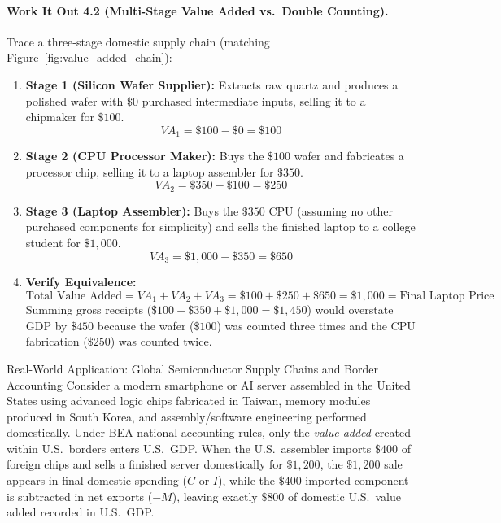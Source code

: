 \documentclass[11pt,letterpaper]{article}
\begin{document}
\paragraph{Work It Out 4.2 (Multi-Stage Value Added vs.\ Double Counting).}
Trace a three-stage domestic supply chain (matching Figure~\ref{fig:value_added_chain}):
\begin{enumerate}
    \item \textbf{Stage 1 (Silicon Wafer Supplier):} Extracts raw quartz and produces a polished wafer with $\$0$ purchased intermediate inputs, selling it to a chipmaker for $\$100$.
    $$VA_1 = \$100 - \$0 = \$100$$
    \item \textbf{Stage 2 (CPU Processor Maker):} Buys the $\$100$ wafer and fabricates a processor chip, selling it to a laptop assembler for $\$350$.
    $$VA_2 = \$350 - \$100 = \$250$$
    \item \textbf{Stage 3 (Laptop Assembler):} Buys the $\$350$ CPU (assuming no other purchased components for simplicity) and sells the finished laptop to a college student for $\$1{,}000$.
    $$VA_3 = \$1{,}000 - \$350 = \$650$$
    \item \textbf{Verify Equivalence:}
    $$\text{Total Value Added} = VA_1 + VA_2 + VA_3 = \$100 + \$250 + \$650 = \$1{,}000 = \text{Final Laptop Price}$$
    Summing gross receipts ($\$100 + \$350 + \$1{,}000 = \$1{,}450$) would overstate GDP by $\$450$ because the wafer ($\$100$) was counted three times and the CPU fabrication ($\$250$) was counted twice.
\end{enumerate}

\begin{examplecase}{Real-World Application: Global Semiconductor Supply Chains and Border Accounting}
Consider a modern smartphone or AI server assembled in the United States using advanced logic chips fabricated in Taiwan, memory modules produced in South Korea, and assembly/software engineering performed domestically. Under BEA national accounting rules, only the \emph{value added} created within U.S.\ borders enters U.S.\ GDP. When the U.S.\ assembler imports $\$400$ of foreign chips and sells a finished server domestically for $\$1{,}200$, the $\$1{,}200$ sale appears in final domestic spending ($C$ or $I$), while the $\$400$ imported component is subtracted in net exports ($-M$), leaving exactly $\$800$ of domestic U.S.\ value added recorded in U.S.\ GDP.
\end{examplecase}

\end{document}
